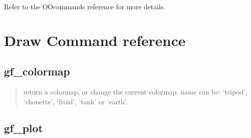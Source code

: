 \documentclass[a4paper,11pt,english]{sphinxmanual}
\begin{document}
\sphinxAtStartPar
Refer to the OO\sphinxhyphen{}commands reference {\hyperref[\detokenize{matlab_octave/oocmd:mlab-oocmd}]{}} for more details.


\chapter{Draw Command reference}
\label{\detokenize{matlab_octave/plotcmdref:draw-command-reference}}\label{\detokenize{matlab_octave/plotcmdref:mlab-plotcmdref}}\label{\detokenize{matlab_octave/plotcmdref::doc}}

\section{gf\_colormap}
\label{\detokenize{matlab_octave/plotcmdref:gf-colormap}}
\sphinxAtStartPar
{}

\begin{sphinxVerbatim}[commandchars=\\\{\}]
\end{sphinxVerbatim}

\sphinxAtStartPar
{}
\begin{quote}

\sphinxAtStartPar
return a colormap, or change the current colormap.
name can be: ‘tripod’, ‘chouette’, ‘froid’, ‘tank’
or ‘earth’.
\end{quote}


\section{gf\_plot}
\label{\detokenize{matlab_octave/plotcmdref:gf-plot}}
\sphinxAtStartPar
{}
\end{document}

